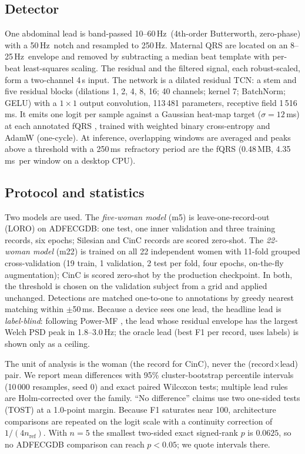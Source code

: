 \documentclass[10pt,twocolumn,a4paper]{article}
\newcommand{\ms}{\,ms}
\newcommand{\Hz}{\,Hz}
\begin{document}
\subsection{Detector}
One abdominal lead is band-passed 10--60\Hz\ (4th-order Butterworth, zero-phase) with a 50\Hz\ notch
and resampled to 250\,Hz. Maternal QRS are located on an 8--25\Hz\ envelope and removed by
subtracting a median beat template with per-beat least-squares scaling. The residual and the filtered
signal, each robust-scaled, form a two-channel 4\,s input. The network is a dilated residual TCN: a
stem and five residual blocks (dilations 1, 2, 4, 8, 16; 40 channels; kernel 7; BatchNorm; GELU) with
a $1\times1$ output convolution, 113\,481 parameters, receptive field 1\,516\ms. It emits one logit
per sample against a Gaussian heat-map target ($\sigma=12$\ms) at each annotated fQRS
\cite{zahid2022}, trained with weighted binary cross-entropy and AdamW (one-cycle). At inference,
overlapping windows are averaged and peaks above a threshold with a 250\ms\ refractory period are
the fQRS (0.48\,MB, 4.35\ms\ per window on a desktop CPU).

\subsection{Protocol and statistics}
Two models are used. The \emph{five-woman model} (m5) is leave-one-record-out (LORO) on ADFECGDB:
one test, one inner validation and three training records, six epochs; Silesian and CinC records
are scored zero-shot. The \emph{22-woman model} (m22) is trained on all 22 independent women with
11-fold grouped cross-validation (19 train, 1 validation, 2 test per fold, four epochs, on-the-fly
augmentation); CinC is scored zero-shot by the production checkpoint. In both, the threshold is chosen
on the validation subject from a grid and applied unchanged. Detections are matched one-to-one to
annotations by greedy nearest matching within $\pm$50\ms. Because a device sees one lead, the
headline lead is \emph{label-blind}: following Power-MF \cite{jaeger2024}, the lead whose residual
envelope has the largest Welch PSD peak in 1.8--3.0\Hz; the oracle lead (best F1 per record, uses
labels) is shown only as a ceiling.

The unit of analysis is the woman (the record for CinC), never the (record$\times$lead) pair. We
report mean differences with 95\% cluster-bootstrap percentile intervals (10\,000 resamples, seed 0)
and exact paired Wilcoxon tests; multiple lead rules are Holm-corrected over the family. ``No
difference'' claims use two one-sided tests (TOST) at a 1.0-point margin. Because F1 saturates near
100, architecture comparisons are repeated on the logit scale with a continuity correction of
$1/(4n_{\mathrm{ref}})$. With $n=5$ the smallest two-sided exact signed-rank $p$ is $0.0625$, so no
ADFECGDB comparison can reach $p<0.05$; we quote intervals there.
\end{document}
